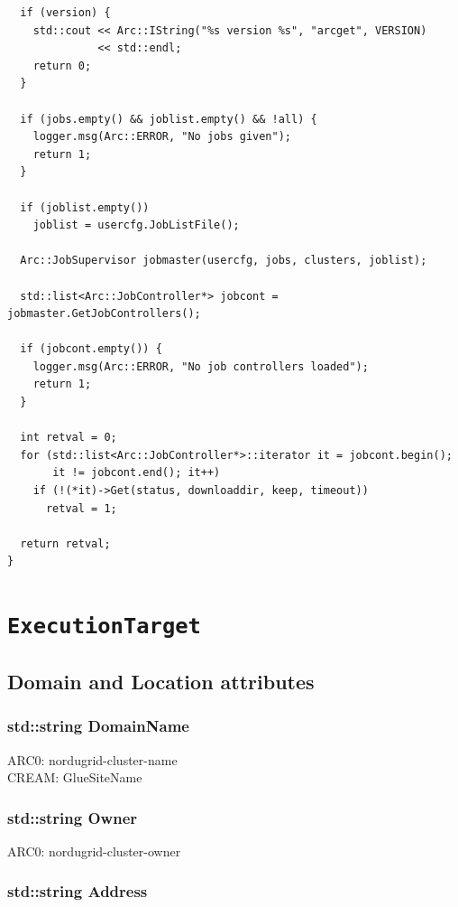 \documentclass{book}
\newcommand{\ExecutionTarget}{\texttt{ExecutionTarget}}
\begin{document}
\begin{shaded}
\begin{verbatim}
  if (version) {
    std::cout << Arc::IString("%s version %s", "arcget", VERSION)
              << std::endl;
    return 0;
  }

  if (jobs.empty() && joblist.empty() && !all) {
    logger.msg(Arc::ERROR, "No jobs given");
    return 1;
  }

  if (joblist.empty())
    joblist = usercfg.JobListFile();

  Arc::JobSupervisor jobmaster(usercfg, jobs, clusters, joblist);

  std::list<Arc::JobController*> jobcont = jobmaster.GetJobControllers();

  if (jobcont.empty()) {
    logger.msg(Arc::ERROR, "No job controllers loaded");
    return 1;
  }

  int retval = 0;
  for (std::list<Arc::JobController*>::iterator it = jobcont.begin();
       it != jobcont.end(); it++)
    if (!(*it)->Get(status, downloaddir, keep, timeout))
      retval = 1;

  return retval;
}
\end{verbatim}
\end{shaded}

\appendix

\chapter{{\ExecutionTarget}}
\label{app:ExTarget}

\section{Domain and Location attributes}

\subsection*{std::string DomainName}

ARC0: nordugrid-cluster-name \\
CREAM: GlueSiteName

\subsection*{std::string Owner}

ARC0: nordugrid-cluster-owner

\subsection*{std::string Address}
\end{document}
